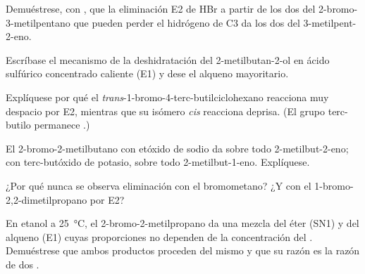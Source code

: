 \begin{exercise}[$\star\star$]\label{exo:b1:elimination:5}
Demuéstrese, con , que la eliminación E2 de HBr a
partir de los dos  del 2-bromo-3-metilpentano que pueden
perder el hidrógeno de C3 da los dos  del
3-metilpent-2-eno.
\end{exercise}

\begin{exercise}[$\star\star$]\label{exo:b1:elimination:6}
Escríbase el mecanismo de la deshidratación del 2-metilbutan-2-ol en
ácido sulfúrico concentrado caliente (E1) y dese el alqueno mayoritario.
\end{exercise}

\begin{exercise}[$\star\star$]\label{exo:b1:elimination:7}
Explíquese por qué el \textit{trans}-1-bromo-4-terc-butilciclohexano
reacciona muy despacio por E2, mientras que su isómero \textit{cis}
reacciona deprisa. (El grupo terc-butilo permanece .)
\end{exercise}

\begin{exercise}[$\star\star$]\label{exo:b1:elimination:8}
El 2-bromo-2-metilbutano con etóxido de sodio da sobre todo
2-metilbut-2-eno; con terc-butóxido de potasio, sobre todo
2-metilbut-1-eno. Explíquese.
\end{exercise}

\begin{exercise}[$\star\star$]\label{exo:b1:elimination:9}
¿Por qué nunca se observa eliminación con el bromometano? ¿Y con el
1-bromo-2,2-dimetilpropano por E2?
\end{exercise}

\begin{exercise}[$\star\star\star$]\label{exo:b1:elimination:10}
En etanol a \qty{25}{\celsius}, el 2-bromo-2-metilpropano da una mezcla
del éter (SN1) y del alqueno (E1) cuyas proporciones no dependen de la
concentración del . Demuéstrese que ambos productos proceden del
mismo  y que su razón es la razón de dos .
\end{exercise}

